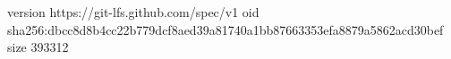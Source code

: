 version https://git-lfs.github.com/spec/v1
oid sha256:dbcc8d8b4cc22b779dcf8aed39a81740a1bb87663353efa8879a5862acd30bef
size 393312
